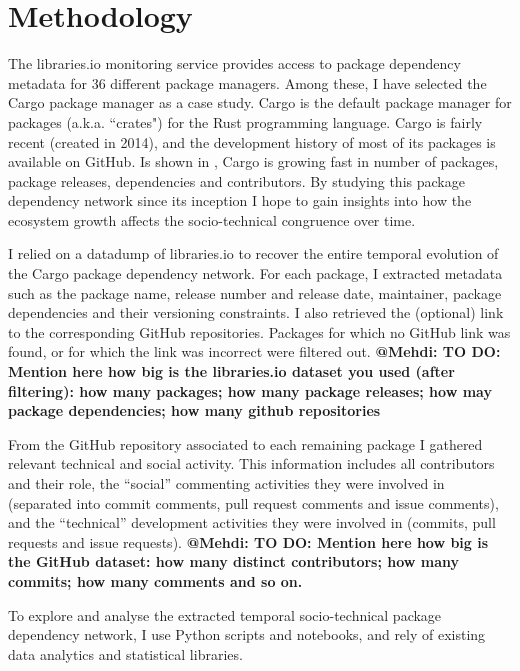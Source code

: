\section{Methodology}

The \textsf{libraries.io} monitoring service provides access to package dependency metadata for 36 different package managers.
Among these, I have selected the Cargo package manager as a case study. Cargo is the default package manager for packages (a.k.a. ``crates") for the Rust programming language. Cargo is fairly recent (created in 2014), and the development history of most of its packages is available on GitHub. 
Is shown in \cite{Decan2019EMSE}, Cargo is growing fast in number of packages, package releases, dependencies and contributors. 
By studying this package dependency network since its inception I hope to gain insights into how the ecosystem growth affects the socio-technical congruence over time.

I relied on a datadump of libraries.io \cite{Katz2018} to recover the entire temporal evolution of the Cargo package dependency network. 
For each package, I extracted metadata such as the package name, release number and release date, maintainer, package dependencies and their versioning constraints. I also retrieved the (optional) link to the corresponding GitHub repositories. Packages for which no GitHub link was found, or for which the link was incorrect were filtered out.
\textbf{\color{red}@Mehdi: TO DO: Mention here how big is the libraries.io dataset you used (after filtering): how many packages; how many package releases; how may package dependencies; how many github repositories}

From the GitHub repository associated to each remaining package I gathered relevant technical and social activity. 
This information includes all contributors and their role, the ``social'' commenting activities they were involved in (separated into commit comments, pull request comments and issue comments), and the ``technical'' development activities they were involved in (commits, pull requests and issue requests).
\textbf{\color{red}@Mehdi: TO DO: Mention here how big is the GitHub dataset: how many distinct contributors; how many commits; how many comments and so on.}

To explore and analyse the extracted temporal socio-technical package dependency network, I use Python scripts and notebooks, and rely of existing data analytics and statistical libraries.

